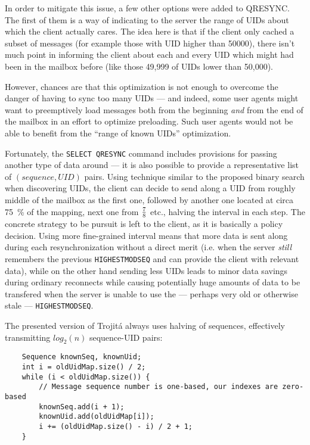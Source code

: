 \documentclass[trojita]{subfiles}
\begin{document}
In order to mitigate this issue, a few other options were added to QRESYNC.  The first of them is a way of indicating to
the server the range of UIDs about which the client actually cares.  The idea here is that if the client only cached a
subset of messages (for example those with UID higher than 50000), there isn't much point in informing the client about
each and every UID which might had been in the mailbox before (like those 49,999 of UIDs lower than 50,000).

However, chances are that this optimization is not enough to overcome the danger of having to sync too many UIDs --- and
indeed, some user agents might want to preemptively load messages both from the beginning {\em and} from the end of the
mailbox in an effort to optimize preloading.  Such user agents would not be able to benefit from the ``range of known
UIDs'' optimization.

Fortunately, the {\tt SELECT QRESYNC} command includes provisions for passing another type of data around --- it is also
possible to provide a representative list of $(sequence, UID)$ pairs.  Using technique similar to the proposed binary
search when discovering UIDs, the client can decide to send along a UID from roughly middle of the mailbox as the first
one, followed by another one located at circa 75~\% of the mapping, next one from $7 \over 8$ etc., halving the interval
in each step.  The concrete strategy to be pursuit is left to the client, as it is basically a policy decision.  Using
more fine-grained interval means that more data is sent along during each resynchronization without a direct merit (i.e.
when the server {\em still} remembers the previous {\tt HIGHESTMODSEQ} and can provide the client with relevant data),
while on the other hand sending less UIDs leads to minor data savings during ordinary reconnects while causing
potentially huge amounts of data to be transfered when the server is unable to use the --- perhaps very old or otherwise
stale --- {\tt HIGHESTMODSEQ}.

\begin{trojitabehavior}
The presented version of Trojitá always uses halving of sequences, effectively transmitting $log_2(n)$ sequence-UID
pairs:
\end{trojitabehavior}

\begin{verbatim}
    Sequence knownSeq, knownUid;
    int i = oldUidMap.size() / 2;
    while (i < oldUidMap.size()) {
        // Message sequence number is one-based, our indexes are zero-based
        knownSeq.add(i + 1);
        knownUid.add(oldUidMap[i]);
        i += (oldUidMap.size() - i) / 2 + 1;
    }
\end{verbatim}
\end{document}
